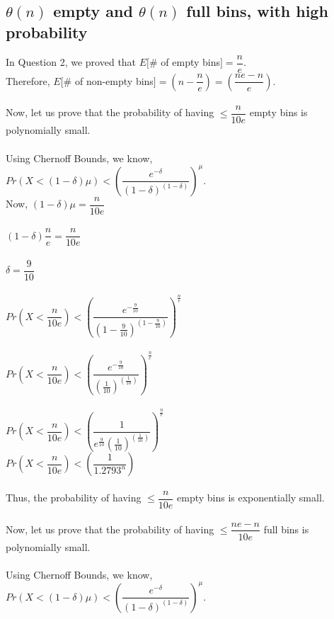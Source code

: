 \documentclass{article}
\begin{document}
\subsection{$\theta(n)$ empty and $\theta(n)$ full bins, with high probability}
In Question 2, we proved that $E[$\# of empty bins$] = \dfrac{n}{e}$. \\
Therefore,
$E[$\# of non-empty bins$] = \left(n-\dfrac{n}{e}\right) = \left(\dfrac{ne-n}{e}\right)$.\\
\\
Now, let us prove that the probability of having $\leq \dfrac{n}{10e} $ empty bins
is polynomially small.\\
\\
Using Chernoff Bounds, we know,
\\
$Pr(X < (1-\delta)\mu) < \left(\dfrac{e^{-\delta}}{(1-\delta)^{(1-\delta)}}\right)^\mu$.
\\
Now, $(1-\delta)\mu = \dfrac{n}{10e}$\\
\\
$(1-\delta)\dfrac{n}{e} = \dfrac{n}{10e}$\\
\\
$\delta = \dfrac{9}{10}$\\
\\
$Pr\left(X < \dfrac{n}{10e}\right) < \left(\dfrac{e^{-\frac{9}{10}}}{(1-\frac{9}{10})^{(1-\frac{9}{10})}}\right)^{\frac{n}{e}}$\\
\\
$Pr\left(X < \dfrac{n}{10e}\right) < \left(\dfrac{e^{-\frac{9}{10}}}{(\frac{1}{10})^{(\frac{1}{10})}}\right)^{\frac{n}{e}}$\\
\\
$Pr\left(X < \dfrac{n}{10e}\right) < \left(\dfrac{1}{e^{\frac{9}{10}}(\frac{1}{10})^{(\frac{1}{10})}}\right)^{\frac{n}{e}}$\\
$Pr\left(X < \dfrac{n}{10e}\right) < \left(\dfrac{1}{1.2793^{n}}\right)$\\
\\
Thus, the probability of having $\leq \dfrac{n}{10e} $ empty bins
is exponentially small.\\
\\
Now, let us prove that the probability of having $\leq \dfrac{ne-n}{10e} $ full bins
is polynomially small.\\
\\
Using Chernoff Bounds, we know,
\\
$Pr(X < (1-\delta)\mu) < \left(\dfrac{e^{-\delta}}{(1-\delta)^{(1-\delta)}}\right)^\mu$.
\\
\end{document}
